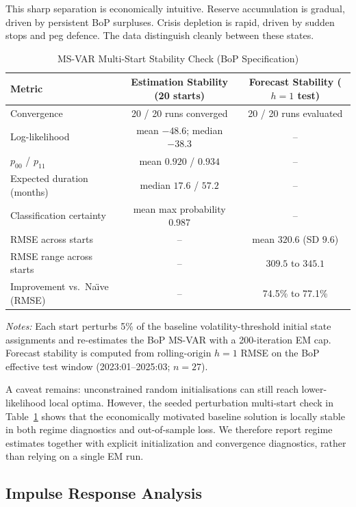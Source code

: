\documentclass[12pt,a4paper]{article}
\begin{document}
This sharp separation is economically intuitive. Reserve accumulation is gradual, driven by persistent BoP surpluses. Crisis depletion is rapid, driven by sudden stops and peg defence. The data distinguish cleanly between these states.

\begin{table}[htbp]
\centering
\caption{MS-VAR Multi-Start Stability Check (BoP Specification)}
\label{tab:multistart}
\begin{tabular}{lcc}
\toprule
Metric & Estimation Stability (20 starts) & Forecast Stability ($h=1$ test) \\
\midrule
Convergence & 20 / 20 runs converged & 20 / 20 runs evaluated \\
Log-likelihood & mean $-48.6$; median $-38.3$ & -- \\
$p_{00}$ / $p_{11}$ & mean $0.920$ / $0.934$ & -- \\
Expected duration (months) & median $17.6$ / $57.2$ & -- \\
Classification certainty & mean max probability $0.987$ & -- \\
RMSE across starts & -- & mean $320.6$ (SD $9.6$) \\
RMSE range across starts & -- & $309.5$ to $345.1$ \\
Improvement vs.\ Na\"{\i}ve (RMSE) & -- & 74.5\% to 77.1\% \\
\bottomrule
\end{tabular}
\begin{tablenotes}
\small
\item \textit{Notes:} Each start perturbs 5\% of the baseline volatility-threshold initial state assignments and re-estimates the BoP MS-VAR with a 200-iteration EM cap. Forecast stability is computed from rolling-origin $h=1$ RMSE on the BoP effective test window (2023:01--2025:03; $n=27$).
\end{tablenotes}
\end{table}

A caveat remains: unconstrained random initialisations can still reach lower-likelihood local optima. However, the seeded perturbation multi-start check in Table~\ref{tab:multistart} shows that the economically motivated baseline solution is locally stable in both regime diagnostics and out-of-sample loss. We therefore report regime estimates together with explicit initialization and convergence diagnostics, rather than relying on a single EM run.

\subsection{Impulse Response Analysis}
\end{document}
